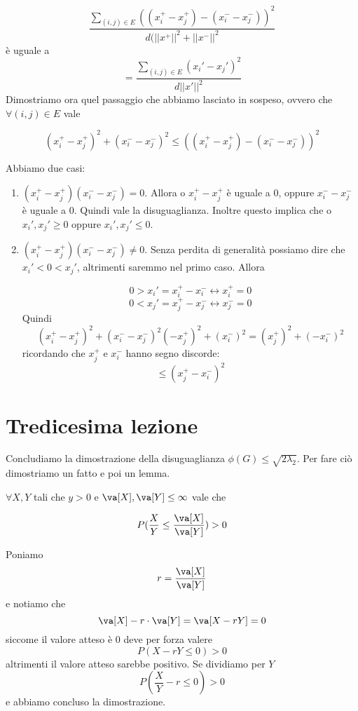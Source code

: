 \documentclass[12pt]{report}
\begin{document}
\begin{dimo}
    $$\frac{\sum_{(i,j) \in E} ( (x_i^+ - x_j^+) - (x_i^- - x_j^-))^2}{d(||x^+||^2 + ||x^-||^2}$$
    è uguale a 
    $$= \frac{\sum_{(i,j) \in E} (x_i'-x_j')^2}{d ||x'||^2}$$
    Dimostriamo ora quel passaggio che abbiamo lasciato in sospeso, ovvero che  $\forall (i,j) \in E$ vale

    $$
        (x_i^+ - x_j^+)^2 + (x_i^- - x_j^-)^2 \leq ( (x_i^+ - x_j^+) - (x_i^- - x_j^-))^2
    $$

    \noindent
    Abbiamo due casi:
    \begin{enumerate}
        \item $(x_i^+ - x_j^+) (x_i^- - x_j^-) = 0$. Allora o $x_i^+ - x_j^+$ è uguale a $0$, oppure $x_i^- - x_j^-$ è uguale  a $0$. Quindi vale la disuguaglianza. Inoltre questo implica che o $x_i',x_j' \geq 0$ oppure $x_i', x_j' \leq 0$.
        \item $(x_i^+ - x_j^+) (x_i^- - x_j^-) \neq 0$. Senza perdita di generalità possiamo dire che  $x_i' < 0 < x_j'$, altrimenti saremmo nel primo caso. Allora

        $$0 > x_i' = x_i^+ - x_i^- \leftrightarrow x_i^+ = 0$$
        $$0 < x_j' = x_j^+ - x_j^- \leftrightarrow x_j^- = 0$$
        Quindi
        $$(x_i^+ - x_j^+)^2 + (x_i^- - x_j^-)^2 (-x_j^+)^2 + (x_i^-)^2 = (x_j^+)^2 + (- x_i^-)^2$$
        ricordando che $x_j^+$ e $x_i^-$ hanno segno discorde:
        $$\leq (x_j^+ - x_i^-)^2$$
        
    \end{enumerate}
\end{dimo}

\chapter{Tredicesima lezione}

\noindent
Concludiamo la dimostrazione della disuguaglianza $\phi(G) \leq \sqrt{2 \lambda_2}$. Per fare ciò dimostriamo un fatto e poi un lemma.

\begin{fatto}
    $\forall X,Y$ tali che $y > 0$ e $\va[X],\va[Y] \leq \infty$ vale che 

    $$P(\frac{X}{Y} \leq \frac{\va[X]}{\va[Y]})>0$$    
\end{fatto}

\begin{dimo}
    Poniamo 
    $$r = \frac{\va[X]}{\va[Y]}$$
    e notiamo che 
    $$\va[X] - r\cdot \va[Y] = \va[X - rY] = 0$$
    siccome il valore atteso è $0$ deve per forza valere
    $$P(X-rY \leq 0) > 0$$
    altrimenti il valore atteso sarebbe positivo.
    Se dividiamo per $Y$
    $$P(\frac{X}{Y} - r \leq 0) > 0$$
    e abbiamo concluso la dimostrazione.
\end{dimo}
\end{document}
